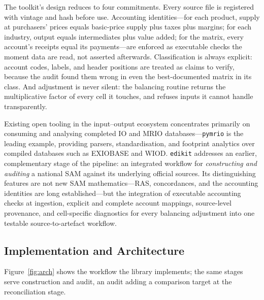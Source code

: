 \documentclass[11pt,a4paper]{article}
\begin{document}
The toolkit's design reduces to four commitments. Every source file is
registered with vintage and hash before use. Accounting identities---for
each product, supply at purchasers' prices equals basic-price supply
plus taxes plus margins; for each industry, output equals intermediates
plus value added; for the matrix, every account's receipts equal its
payments---are enforced as executable checks the moment data are read,
not asserted afterwards. Classification is always explicit: account
codes, labels, and header positions are treated as claims to verify,
because the audit found them wrong in even the best-documented matrix in
its class. And adjustment is never silent: the balancing routine returns
the multiplicative factor of every cell it touches, and refuses inputs
it cannot handle transparently.

Existing open tooling in the input--output ecosystem concentrates
primarily on consuming and analysing completed IO and MRIO
databases---\texttt{pymrio} \cite{stadler2021} is the leading
example, providing parsers, standardisation, and footprint analytics
over compiled databases such as EXIOBASE and WIOD. \texttt{edikit}
addresses an earlier, complementary stage of the pipeline: an integrated
workflow for \emph{constructing and auditing} a national SAM against
its underlying official sources. Its distinguishing features are not new
SAM mathematics---RAS, concordances, and the accounting identities are
long established---but the integration of executable accounting checks
at ingestion, explicit and complete account mappings, source-level
provenance, and cell-specific diagnostics for every balancing
adjustment into one testable source-to-artefact workflow.

\subsection{Implementation and Architecture}

Figure~\ref{fig:arch} shows the workflow the library implements; the
same stages serve construction and audit, an audit adding a comparison
target at the reconciliation stage.
\end{document}
